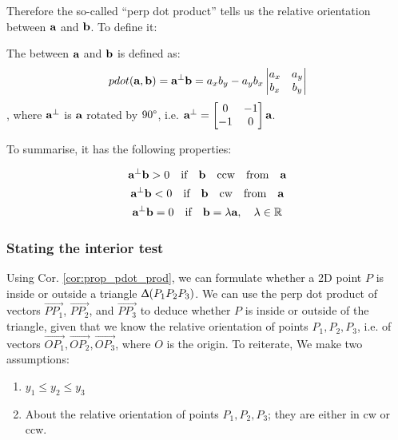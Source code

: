 \documentclass[a4paper]{article}
\begin{document}
Therefore the so-called ``perp dot product'' tells us the relative orientation between $\textbf{a}$ and $\textbf{b}$. To define it:

\begin{definition}
The  between $\textbf{a}$ and $\textbf{b}$ is defined as:
\begin{equation}
    pdot(\textbf{a}, \textbf{b}) = \textbf{a} ^{\bot} \textbf{b}  = 
    a_xb_y - a_yb_x
    \left|
    \begin{matrix}
    a_x & a_y \\
    b_x & b_y
    \end{matrix}
    \right |
\end{equation}
, where $\textbf{a}^{\bot}$ is $\textbf{a}$ rotated by $90\degree$, i.e. $\textbf{a}^{\bot} = \begin{bmatrix}
0 & -1 \\-1 & 0\end{bmatrix}\textbf{a}$.
\end{definition}
To summarise, it has the following properties:
\begin{corollary}
\label{cor:prop_pdot_prod}
\begin{gather}
    \textbf{a}^{\bot} \textbf{b} > 0 \quad \textup{if} \quad \textbf{b} \quad \textup{ccw} \quad \textup{from} \quad \textbf{a} \label{eq:prop_pdot_ccw}\\
    \textbf{a}^{\bot} \textbf{b} < 0 \quad \textup{if} \quad \textbf{b} \quad \textup{cw} \quad \textup{from} \quad \textbf{a} \label{eq:prop_pdot_cw}
    \\
    \textbf{a}^{\bot} \textbf{b} = 0 \quad \textup{if} \quad \textbf{b} = \lambda \textbf{a}, \quad \lambda \in \mathbb{R}
    \label{eq:prop_pdot_par}
\end{gather}
\end{corollary}


\subsubsection{Stating the interior test}

Using Cor. \ref{cor:prop_pdot_prod}, we can formulate whether a 2D point $P$ is inside or outside a triangle $\Updelta(P_1P_2P_3)$. We can use the perp dot product of vectors  $\overrightarrow{PP_1}$, $\overrightarrow{PP_2}$, and $\overrightarrow{PP_3}$ to deduce whether $P$ is inside or outside of the triangle, given that we know the relative orientation of points $P_1, P_2, P_3$, i.e. of vectors $\overrightarrow{OP_1}, \overrightarrow{OP_2},\overrightarrow{OP_3}$, where $O$ is the origin. To reiterate, We make two assumptions:
\begin{enumerate}
    \item $y_1 \leq y_2 \leq y_3$
    \item About the relative orientation of points $P_1, P_2, P_3$; they are either in cw or ccw.
\end{enumerate}
\end{document}
